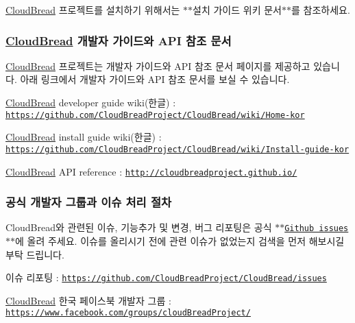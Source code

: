 \hyperlink{a00217}{Cloud\+Bread} 프로젝트를 설치하기 위해서는 $\ast$$\ast$설치 가이드 위키 문서$\ast$$\ast$를 참조하세요.

\subsubsection*{\hyperlink{a00217}{Cloud\+Bread} 개발자 가이드와 A\+PI 참조 문서}

\hyperlink{a00217}{Cloud\+Bread} 프로젝트는 개발자 가이드와 A\+PI 참조 문서 페이지를 제공하고 있습니다. 아래 링크에서 개발자 가이드와 A\+PI 참조 문서를 보실 수 있습니다.
\begin{DoxyItemize}
\item \hyperlink{a00217}{Cloud\+Bread} developer guide wiki(한글) \+: \href{https://github.com/CloudBreadProject/CloudBread/wiki/Home-kor}{\tt https\+://github.\+com/\+Cloud\+Bread\+Project/\+Cloud\+Bread/wiki/\+Home-\/kor}
\item \hyperlink{a00217}{Cloud\+Bread} install guide wiki(한글) \+: \href{https://github.com/CloudBreadProject/CloudBread/wiki/Install-guide-kor}{\tt https\+://github.\+com/\+Cloud\+Bread\+Project/\+Cloud\+Bread/wiki/\+Install-\/guide-\/kor}
\item \hyperlink{a00217}{Cloud\+Bread} A\+PI reference \+: \href{http://cloudbreadproject.github.io/}{\tt http\+://cloudbreadproject.\+github.\+io/}
\end{DoxyItemize}

\subsubsection*{공식 개발자 그룹과 이슈 처리 절차}

Cloud\+Bread와 관련된 이슈, 기능추가 및 변경, 버그 리포팅은 공식 $\ast$$\ast$\href{https://github.com/CloudBreadProject/CloudBread/issues}{\tt Github issues}$\ast$$\ast$에 올려 주세요. 이슈를 올리시기 전에 관련 이슈가 없었는지 검색을 먼저 해보시길 부탁 드립니다.
\begin{DoxyItemize}
\item 이슈 리포팅 \+: \href{https://github.com/CloudBreadProject/CloudBread/issues}{\tt https\+://github.\+com/\+Cloud\+Bread\+Project/\+Cloud\+Bread/issues}
\item \hyperlink{a00217}{Cloud\+Bread} 한국 페이스북 개발자 그룹 \+: \href{https://www.facebook.com/groups/cloudBreadProject/}{\tt https\+://www.\+facebook.\+com/groups/cloud\+Bread\+Project/}
\end{DoxyItemize}

